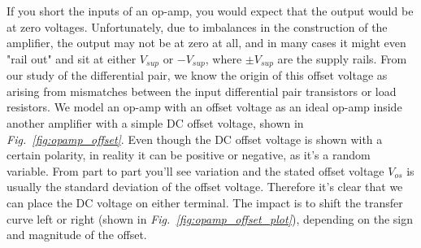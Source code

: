 If you short the inputs of an op-amp, you would expect that the output would be at zero voltages.  Unfortunately, due to imbalances in the construction of the amplifier, the output may not be at zero at all, and in many cases it might even "rail out" and sit at either $V_{sup}$ or $-V_{sup}$, where $\pm V_{sup}$ are the supply rails.  From our study of the differential pair, we know the origin of this offset voltage as arising from mismatches between the input differential pair transistors or load resistors.  
We model an op-amp with an offset voltage as an ideal op-amp inside another amplifier with a simple DC offset voltage, shown in \emph{Fig.~\ref{fig:opamp_offset}}.  Even though the DC offset voltage is shown with a certain polarity, in reality it can be positive or negative, as it's a random variable.  From part to part you'll see variation and the stated offset voltage $V_{os}$ is usually the standard deviation of the offset voltage.  Therefore it's clear that we can place the DC voltage on either terminal.  The impact is to shift the transfer curve left or right \big(shown in \emph{Fig.~\ref{fig:opamp_offset_plot}}\big), depending on the sign and magnitude of the offset.
